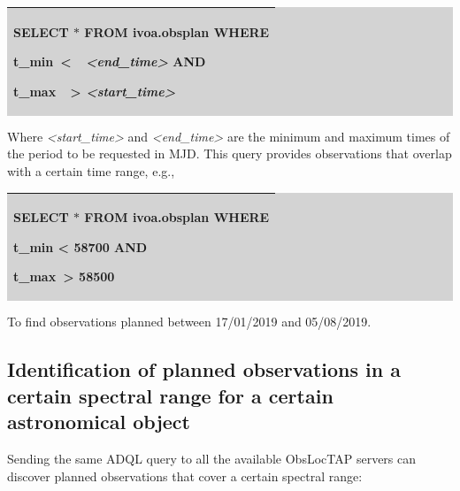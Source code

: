 \documentclass[11pt,a4paper]{ivoa}
\begin{document}
\bigskip
\par
\begingroup\setlength{\fboxsep}{0pt}
\colorbox{lightgray}{%
\begin{tabular}{|p{5.53in}|}
\hline
SELECT $\ast$  FROM ivoa.obsplan WHERE  \par  t\_min\  <\ \  \textit{<end\_time>} AND \par  t\_max\ \ >  \textit{<start\_time>} \\
\hline
\end{tabular}%
}\endgroup
\par
\bigskip
Where \textit{<start\_time>} and \textit{<end\_time> }are the minimum and maximum times 
of the period to be requested in MJD. This query provides observations that overlap with 
a certain time range, e.g.,

\bigskip
\par
\begingroup\setlength{\fboxsep}{0pt}
\colorbox{lightgray}{%
\begin{tabular}{|p{5.53in}|}
\hline
SELECT $\ast$  FROM ivoa.obsplan WHERE  \par  t\_min < 58700 AND  \par  t\_max\  > 58500 \\
\hline
\end{tabular}%
}\endgroup
\par
\bigskip

To find observations planned between 17/01/2019 and 05/08/2019.

\subsection{Identification of planned observations in a certain spectral range for a certain astronomical object}
Sending the same ADQL query to all the available ObsLocTAP servers can discover planned 
observations that cover a certain spectral range:
\end{document}
